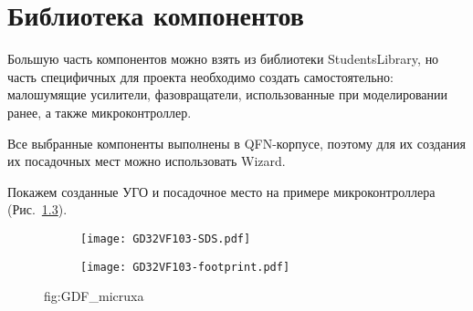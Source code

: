 \chapter{Библиотека компонентов}

Большую часть компонентов можно взять из библиотеки StudentsLibrary, но часть специфичных для проекта необходимо создать самостоятельно: малошумящие усилители, фазовращатели, использованные при моделировании ранее, а также микроконтроллер.

Все выбранные компоненты выполнены в QFN-корпусе, поэтому для их создания их посадочных мест можно использовать Wizard.

Покажем созданные УГО и посадочное место на примере микроконтроллера (Рис.~\ref{fig:GD32VF103}).
\begin{figure}[H]
    \centering
    \begin{subfigure}{0.48\textwidth}
        \centering
        \texttt{[image: GD32VF103-SDS.pdf]}
        \caption{}%
        \label{fig:GD32VF103-SDS.pdf}
    \end{subfigure}
    \hfill
\begin{subfigure}{0.48\textwidth}
        \centering
        \texttt{[image: GD32VF103-footprint.pdf]}
        \caption{}%
        \label{fig:GD32VF103-footprint.pdf}
    \end{subfigure}
    \caption{fig:GDF_micruxa}%
    \label{fig:GD32VF103}
\end{figure}
